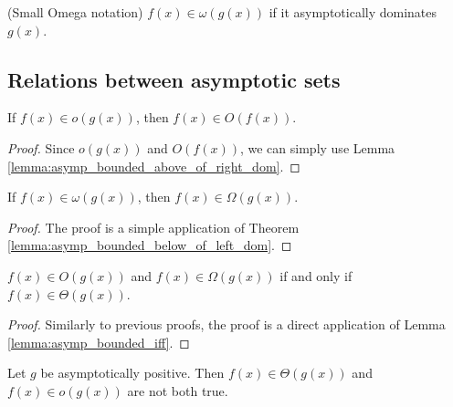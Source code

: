 \begin{definition}(Small Omega notation)
    \label{def:small_omega}
    \leanok
    $f(x) \in \omega(g(x))$ if it asymptotically dominates $g(x)$.
\end{definition}


\subsection{Relations between asymptotic sets} 

\begin{lemma}
    \label{lemma:big_o_of_small_o}
    \leanok
    If $f(x) \in o(g(x))$, then $f(x) \in O(f(x))$.
\end{lemma}

\begin{proof}
    \leanok
    Since $o(g(x))$ and $O(f(x))$, we can simply use Lemma 
    \ref{lemma:asymp_bounded_above_of_right_dom}.
\end{proof}

\begin{theorem}
    \label{thm:big_omega_of_small_omega}
    \leanok
    If $f(x) \in \omega(g(x))$, then $f(x) \in \Omega(g(x))$.
\end{theorem}

\begin{proof}
    \leanok
    The proof is a simple application of Theorem 
    \ref{lemma:asymp_bounded_below_of_left_dom}.
\end{proof}

\begin{theorem}
    \label{thm:big_o_and_omega_iff_theta}
    \leanok
    $f(x) \in O(g(x))$ and $f(x) \in \Omega(g(x))$ if and only if 
    $f(x) \in \Theta(g(x))$.
\end{theorem}

\begin{proof}
    \leanok
    Similarly to previous proofs, the proof is a direct application of Lemma 
    \ref{lemma:asymp_bounded_iff}.
\end{proof}

\begin{lemma}
    \label{lemma:not_asymp_pos_theta_and_small_o}
    \leanok
    Let $g$ be asymptotically positive. Then $f(x) \in \Theta(g(x))$ and $f(x) \in o(g(x))$
    are not both true.
\end{lemma}

